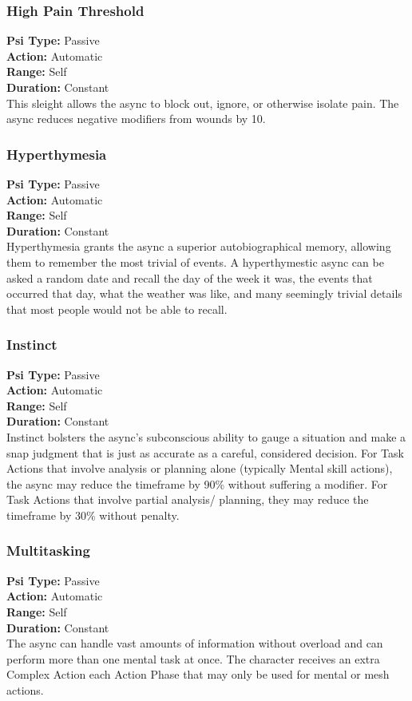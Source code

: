 \subsubsection{High Pain Threshold} \textbf{Psi Type:} Passive \\ \textbf{Action:} Automatic \\ \textbf{Range:} Self \\ \textbf{Duration:} Constant \\ This sleight allows the async to block out, ignore, or otherwise isolate pain. The async reduces negative modifiers from wounds by 10. 

\subsubsection{Hyperthymesia} \textbf{Psi Type:} Passive \\ \textbf{Action:} Automatic \\ \textbf{Range:} Self \\ \textbf{Duration:} Constant \\ Hyperthymesia grants the async a superior autobiographical memory, allowing them to remember the most trivial of events. A hyperthymestic async can be asked a random date and recall the day of the week it was, the events that occurred that day, what the weather was like, and many seemingly trivial details that most people would not be able to recall. 

\subsubsection{Instinct} \textbf{Psi Type:} Passive \\ \textbf{Action:} Automatic \\ \textbf{Range:} Self \\ \textbf{Duration:} Constant \\ Instinct bolsters the async’s subconscious ability to gauge a situation and make a snap judgment that is just as accurate as a careful, considered decision. For Task Actions that involve analysis or planning alone (typically Mental skill actions), the async may reduce the timeframe by 90\% without suffering a modifier. For Task Actions that involve partial analysis/ planning, they may reduce the timeframe by 30\% without penalty. 

\subsubsection{Multitasking} \textbf{Psi Type:} Passive \\ \textbf{Action:} Automatic \\ \textbf{Range:} Self \\ \textbf{Duration:} Constant \\ The async can handle vast amounts of information without overload and can perform more than one mental task at once. The character receives an extra Complex Action each Action Phase that may only be used for mental or mesh actions. 

